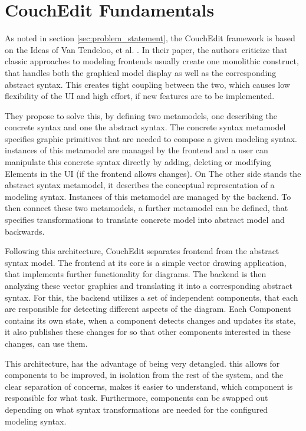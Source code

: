 \chapter{CouchEdit Fundamentals}
As noted in section \ref{sec:problem_statement}, the CouchEdit framework is based on the Ideas of Van Tendeloo, et al. \cite{van_tendeloo_concrete_2017}. In their paper, the authors criticize that classic approaches to modeling frontends usually create one monolithic construct, that handles both the graphical model display as well as the corresponding abstract syntax. This creates tight coupling between the two, which causes low flexibility of the UI and high effort, if new features are to be implemented. 

They propose to solve this, by defining two metamodels, one describing the concrete syntax and one the abstract syntax. The concrete syntax metamodel specifies graphic primitives that are needed to compose a given modeling syntax. instances of this metamodel are managed by the frontend and a user can manipulate this concrete syntax directly by adding, deleting or modifying Elements in the UI (if the frontend allows changes). On The other side stands the abstract syntax metamodel, it describes the conceptual representation of a modeling syntax. Instances of this metamodel are managed by the backend. To then connect these two metamodels, a further metamodel can be defined, that specifies transformations to translate concrete model into abstract model and backwards. 

Following this architecture, CouchEdit separates frontend from the abstract syntax model. The frontend at its core is a simple vector drawing application, that implements further functionality for diagrams. The backend is then analyzing these vector graphics and translating it into a corresponding abstract syntax. For this, the backend utilizes a set of independent components, that each are responsible for detecting different aspects of the diagram. Each Component contains its own state, when a component detects changes and updates its state, it also publishes these changes for so that other components interested in these changes, can use them.  

This architecture, has the advantage of being very detangled. this allows for components to be improved, in isolation from the rest of the system, and the clear separation of concerns, makes it easier to understand, which component is responsible for what task. Furthermore, components can be swapped out depending on what syntax transformations are needed for the configured modeling syntax.


